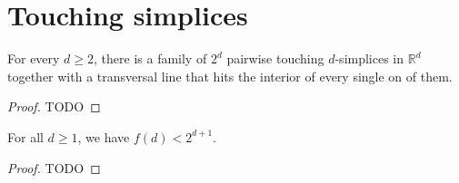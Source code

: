 \chapter{Touching simplices}

\begin{theorem}
  \label{ch16theorem1}
  For every \(d\ge 2\), there is a family of \(2^d\) pairwise touching
  \(d\)-simplices in \(\mathbb{R}^d\) together with a transversal line that hits the interior
  of every single on of them.
\end{theorem}
\begin{proof}
  TODO
\end{proof}

\begin{theorem}
  \label{ch16theorem2}
  For all \(d \ge 1\), we have \(f(d)< 2^{d+1}\).
\end{theorem}
\begin{proof}
  TODO
\end{proof}
